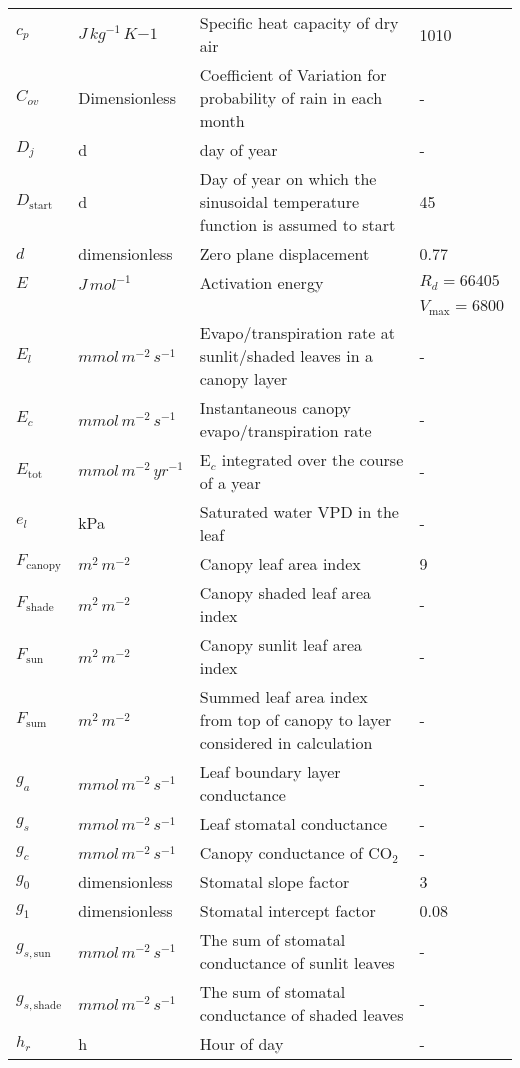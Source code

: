 \documentclass[12pt]{report}
\begin{document}
\begin{center}
\begin{longtable}{l l p{3in} p{0.5in}}
$c_p$	&	$J\, kg^{-1}\, K{-1}$	&	Specific heat capacity of dry air 	&	1010	\\
$C_{ov}$	&	Dimensionless	&	Coefficient of Variation for probability of rain in each month	&	-	\\
$D_j$	&	d	&	day of year	&	-	\\
$D_{\text{start}}$	&	d	&	Day of year on which the sinusoidal temperature function is assumed to start	&	45	\\
$d$	&	dimensionless	&	Zero plane displacement	&	0.77	\\
$E$	&	$J\, mol^{-1}$	&	Activation energy	&	$R_{d}=66405$	\\
	&		&		&	$V_{\text{max}}=6800$	\\
$E_l$	&	$mmol\,m^{-2}\,s^{-1}$ 	&	Evapo/transpiration rate at sunlit/shaded leaves in a canopy layer	&	-	\\
$E_c$	&	$mmol\,m^{-2}\, s^{-1}$	&	Instantaneous canopy evapo/transpiration rate	&	-	\\
$E_{\text{tot}}$	&	$mmol\, m^{-2}\, yr^{-1}$	&	E$_c$ integrated over the course of a year	&	-	\\
$e_l$	&	kPa	&	Saturated water VPD in the leaf	&	-	\\
$F_{\text{canopy}}$	&	$m^2\, m^{-2}$	&	Canopy leaf area index	&	9	\\
$F_{\text{shade}}$	&	$m^2\, m^{-2}$	&	Canopy shaded leaf area index	&	-	\\
$F_{\text{sun}}$	&	$m^2\,m^{-2}$	&	Canopy sunlit leaf area index	&	-	\\
$F_{\text{sum}}$	&	$m^2\, m^{-2}$	&	Summed leaf area index from top of canopy to layer considered in calculation	&	-	\\
$g_a$	&	$mmol\,m^{-2}\, s^{-1}$	&	Leaf boundary layer conductance	&	-	\\
$g_s$	&	$mmol\,m^{-2}\, s^{-1}$	&	Leaf stomatal conductance	&	-	\\
$g_c$	&	$mmol\,m^{-2}\, s^{-1}$	&	Canopy conductance of CO$_2$ 	&	-	\\
$g_0$	&	dimensionless	&	Stomatal slope factor	&	3	\\
$g_1$	&	dimensionless	&	Stomatal intercept factor	&	0.08	\\
$g_{s,\text{sun}}$	&	$mmol\, m^{-2}\, s^{-1}$	&	The sum of stomatal conductance of sunlit leaves	&	-	\\
$g_{s,\text{shade}}$	&	$mmol\, m^{-2}\, s^{-1}$	&	The sum of stomatal conductance of shaded leaves	&	-	\\
$h_r$	&	h	&	Hour of day	&	-	\\

\end{longtable}
\end{center}
\end{document}

